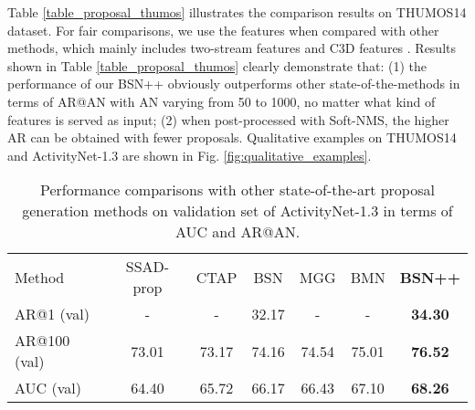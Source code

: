 \documentclass[letterpaper]{article} \usepackage{aaai21}  \usepackage{times}  \usepackage{helvet} \usepackage{courier}  \usepackage[hyphens]{url}  \usepackage{graphicx} \urlstyle{rm} \def\UrlFont{\rm}  \usepackage{natbib}  \usepackage{amsmath,amssymb} \usepackage{caption} \frenchspacing  \usepackage{color}
\begin{document}
Table \ref{table_proposal_thumos} illustrates the comparison results on THUMOS14 dataset. For fair comparisons, we use the features when compared with other methods, which mainly includes two-stream features and C3D features \cite{D.Tran}. Results shown in Table \ref{table_proposal_thumos} clearly demonstrate that: (1) the performance of our BSN++ obviously outperforms other state-of-the-methods in terms of AR@AN with AN varying from 50 to 1000, no matter what kind of features is served as input; (2) when post-processed with Soft-NMS, the higher AR can be obtained with fewer proposals. Qualitative examples on THUMOS14 and ActivityNet-1.3 are shown in Fig. \ref{fig:qualitative_examples}.
 
\setlength{\tabcolsep}{1pt}
\begin{table}[t]
\caption{Performance comparisons with other state-of-the-art proposal generation methods on validation set of ActivityNet-1.3 in terms of AUC and AR@AN.}
	\begin{tabular}{m{2.1cm}cccccc}
		\toprule
		Method  & SSAD-prop &CTAP &BSN &MGG & BMN & \textbf{BSN++} \tabularnewline
		\noalign{\smallskip}
		\hline  
		\noalign{\smallskip}
		AR@1 (val) & -  & - & 32.17 & - & - & \textbf{34.30}  \tabularnewline
		AR@100 (val) & 73.01 & 73.17 & 74.16 & 74.54 & 75.01 & \textbf{76.52} \tabularnewline
		AUC (val) & 64.40 & 65.72 & 66.17 & 66.43 & 67.10 &  \textbf{68.26} \tabularnewline
 
		\bottomrule
	\end{tabular}
	\label{table_proposal_anet}
\end{table}
\end{document}
